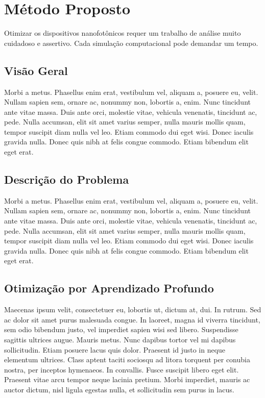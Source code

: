 \chapter{Método Proposto}      \label{Metodo Proposto}

Otimizar os dispositivos nanofotônicos requer um trabalho de análise muito cuidadoso e assertivo. Cada simulação computacional pode demandar um tempo.

\section{Visão Geral}

Morbi a metus. Phasellus enim erat, vestibulum vel, aliquam a, posuere eu, velit. Nullam sapien sem, ornare ac, nonummy non, lobortis a, enim. Nunc tincidunt ante vitae massa. Duis ante orci, molestie vitae, vehicula venenatis, tincidunt ac, pede. Nulla accumsan, elit sit amet varius semper, nulla mauris mollis quam, tempor suscipit diam nulla vel leo. Etiam commodo dui eget wisi. Donec iaculis gravida nulla. Donec quis nibh at felis congue commodo. Etiam bibendum elit eget erat.


\section{Descrição do Problema}

Morbi a metus. Phasellus enim erat, vestibulum vel, aliquam a, posuere eu, velit. Nullam sapien sem, ornare ac, nonummy non, lobortis a, enim. Nunc tincidunt ante vitae massa. Duis ante orci, molestie vitae, vehicula venenatis, tincidunt ac, pede. Nulla accumsan, elit sit amet varius semper, nulla mauris mollis quam, tempor suscipit diam nulla vel leo. Etiam commodo dui eget wisi. Donec iaculis gravida nulla. Donec quis nibh at felis congue commodo. Etiam bibendum elit eget erat.


\section{Otimização por Aprendizado Profundo}

Maecenas ipsum velit, consectetuer eu, lobortis ut, dictum at, dui. In rutrum. Sed ac dolor sit amet purus malesuada congue. In laoreet, magna id viverra tincidunt, sem odio bibendum justo, vel imperdiet sapien wisi sed libero. Suspendisse sagittis ultrices augue. Mauris metus. Nunc dapibus tortor vel mi dapibus sollicitudin. Etiam posuere lacus quis dolor. Praesent id justo in neque elementum ultrices. Class aptent taciti sociosqu ad litora torquent per conubia nostra, per inceptos hymenaeos. In convallis. Fusce suscipit libero eget elit. Praesent vitae arcu tempor neque lacinia pretium. Morbi imperdiet, mauris ac auctor dictum, nisl ligula egestas nulla, et sollicitudin sem purus in lacus.

